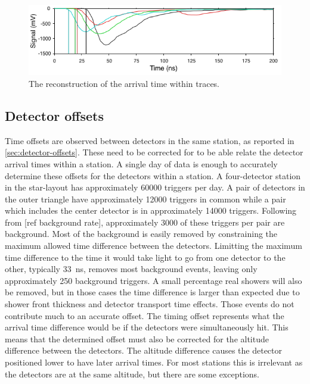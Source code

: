 \begin{figure}
    \centering
    \includegraphics[width=0.7\linewidth]{plots/processing/arrival_time.png}
    \caption{The reconstruction of the arrival time within traces.}
    \label{fig:arrival_time}
\end{figure}


\subsection{Detector offsets}
\label{sec:process_detector_offsets}

Time offsets are observed between detectors in the same station, as reported in \cref{sec:detector-offsets}. These need to be corrected for to be able relate the detector arrival times within a station. A single day of data is enough to accurately determine these offsets for the detectors within a station. A four-detector station in the star-layout has approximately \num{60000} triggers per day. A pair of detectors in the outer triangle have approximately \num{12000} triggers in common while a pair which includes the center detector is in approximately \num{14000} triggers. Following from [ref background rate], approximately \num{3000} of these triggers per pair are background. Most of the background is easily removed by constraining the maximum allowed time difference between the detectors. Limitting the maximum time difference to the time it would take light to go from one detector to the other, typically \SI{33}{\ns}, removes most background events, leaving only approximately \num{250} background triggers. A small percentage real showers will also be removed, but in those cases the time difference is larger than expected due to shower front thickness and detector transport time effects. Those events do not contribute much to an accurate offset. The timing offset represents what the arrival time difference would be if the detectors were simultaneously hit. This means that the determined offset must also be corrected for the altitude difference between the detectors. The altitude difference causes the detector positioned lower to have later arrival times. For most stations this is irrelevant as the detectors are at the same altitude, but there are some exceptions.

